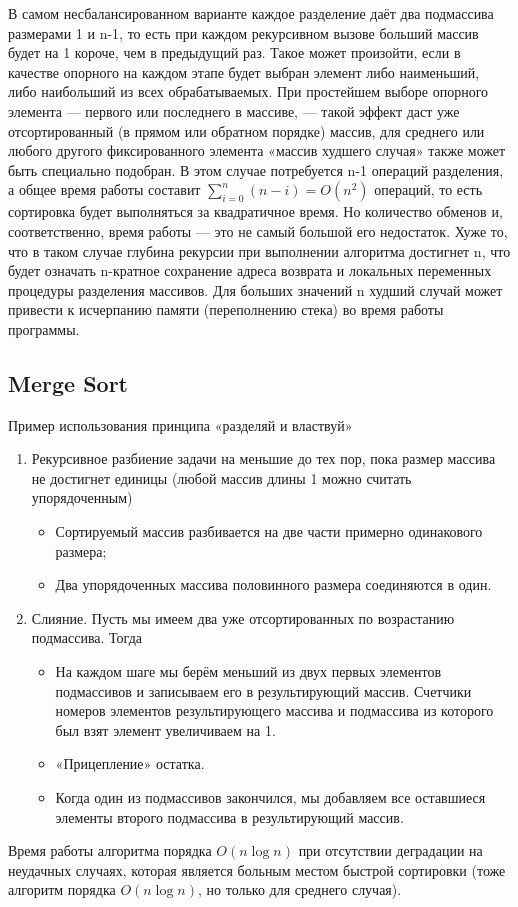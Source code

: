 \documentclass[a4paper]{article}
\begin{document}
\begin{itemize}
В самом несбалансированном варианте каждое разделение даёт два подмассива размерами 1 и n-1, то есть при каждом рекурсивном вызове больший массив будет на 1 короче, чем в предыдущий раз. Такое может произойти, если в качестве опорного на каждом этапе будет выбран элемент либо наименьший, либо наибольший из всех обрабатываемых. При простейшем выборе опорного элемента — первого или последнего в массиве, — такой эффект даст уже отсортированный (в прямом или обратном порядке) массив, для среднего или любого другого фиксированного элемента «массив худшего случая» также может быть специально подобран. В этом случае потребуется n-1 операций разделения, а общее время работы составит $\sum_{i=0}^n (n-i) = O(n^2)$ операций, то есть сортировка будет выполняться за квадратичное время. Но количество обменов и, соответственно, время работы — это не самый большой его недостаток. Хуже то, что в таком случае глубина рекурсии при выполнении алгоритма достигнет n, что будет означать n-кратное сохранение адреса возврата и локальных переменных процедуры разделения массивов. Для больших значений n худший случай может привести к исчерпанию памяти (переполнению стека) во время работы программы.

\end{itemize}


\subsection{Merge Sort}
Пример использования принципа «разделяй и властвуй»
\begin{enumerate}
	\item Рекурсивное разбиение задачи на меньшие до тех пор, пока размер массива не достигнет единицы (любой массив длины 1 можно считать упорядоченным)
	\begin{itemize}
		\item Сортируемый массив разбивается на две части примерно одинакового размера;
		\item Два упорядоченных массива половинного размера соединяются в один.
	\end{itemize}
	\item Слияние. Пусть мы имеем два уже отсортированных по возрастанию подмассива. Тогда
	\begin{itemize}
		\item На каждом шаге мы берём меньший из двух первых элементов подмассивов и записываем его в результирующий массив. Счетчики номеров элементов результирующего массива и подмассива из которого был взят элемент увеличиваем на 1.
		\item «Прицепление» остатка.
		\item Когда один из подмассивов закончился, мы добавляем все оставшиеся элементы второго подмассива в результирующий массив.
	\end{itemize}
\end{enumerate}
Время работы алгоритма порядка $O(n \log n)$ при отсутствии деградации на неудачных случаях, которая является больным местом быстрой сортировки (тоже алгоритм порядка $O(n \log n)$, но только для среднего случая).
\end{document}
